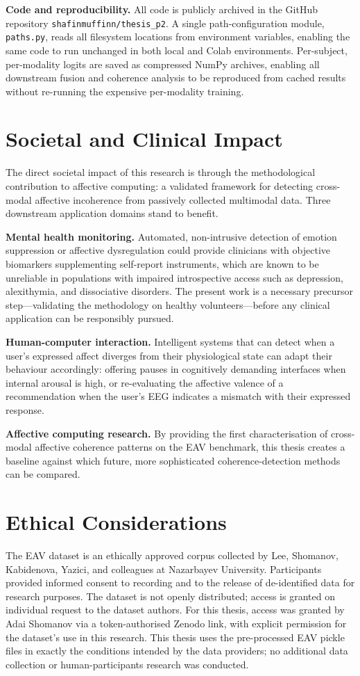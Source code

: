 \textbf{Code and reproducibility.} All code is publicly archived in the GitHub repository \texttt{shafinmuffinn/thesis\_p2}. A single path-configuration module, \texttt{paths.py}, reads all filesystem locations from environment variables, enabling the same code to run unchanged in both local and Colab environments. Per-subject, per-modality logits are saved as compressed NumPy archives, enabling all downstream fusion and coherence analysis to be reproduced from cached results without re-running the expensive per-modality training.

\section{Societal and Clinical Impact}
The direct societal impact of this research is through the methodological contribution to affective computing: a validated framework for detecting cross-modal affective incoherence from passively collected multimodal data. Three downstream application domains stand to benefit.

\textbf{Mental health monitoring.} Automated, non-intrusive detection of emotion suppression or affective dysregulation could provide clinicians with objective biomarkers supplementing self-report instruments, which are known to be unreliable in populations with impaired introspective access such as depression, alexithymia, and dissociative disorders. The present work is a necessary precursor step---validating the methodology on healthy volunteers---before any clinical application can be responsibly pursued.

\textbf{Human-computer interaction.} Intelligent systems that can detect when a user's expressed affect diverges from their physiological state can adapt their behaviour accordingly: offering pauses in cognitively demanding interfaces when internal arousal is high, or re-evaluating the affective valence of a recommendation when the user's EEG indicates a mismatch with their expressed response.

\textbf{Affective computing research.} By providing the first characterisation of cross-modal affective coherence patterns on the EAV benchmark, this thesis creates a baseline against which future, more sophisticated coherence-detection methods can be compared.

\section{Ethical Considerations}
The EAV dataset is an ethically approved corpus collected by Lee, Shomanov, Kabidenova, Yazici, and colleagues at Nazarbayev University. Participants provided informed consent to recording and to the release of de-identified data for research purposes. The dataset is not openly distributed; access is granted on individual request to the dataset authors. For this thesis, access was granted by Adai Shomanov via a token-authorised Zenodo link, with explicit permission for the dataset's use in this research. This thesis uses the pre-processed EAV pickle files in exactly the conditions intended by the data providers; no additional data collection or human-participants research was conducted.

